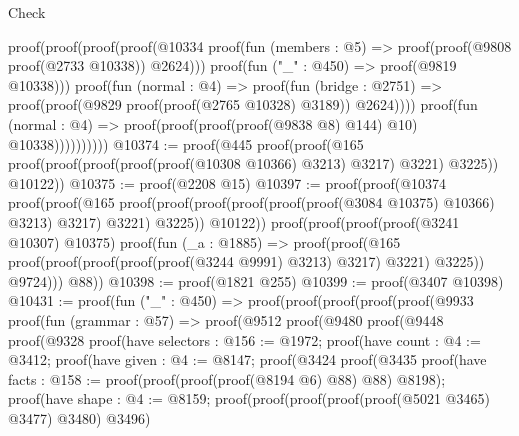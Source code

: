 \begin{lexlean}{Check}
\begin{coremodule}
                            proof(proof(proof(proof(@10334
                                      proof(fun (members : @5) =>
                                        proof(proof(@9808 proof(@2733 @10338)) @2624)))
                                    proof(fun ("_" : @450) => proof(@9819 @10338)))
                                  proof(fun (normal : @4) =>
                                    proof(fun (bridge : @2751) =>
                                      proof(proof(@9829 proof(proof(@2765 @10328) @3189)) @2624))))
                                proof(fun (normal : @4) =>
                                  proof(proof(proof(proof(@9838 @8) @144) @10) @10338))))))))))
@10374 := proof(@445
      proof(proof(@165 proof(proof(proof(proof(proof(@10308 @10366) @3213) @3217) @3221) @3225))
          @10122))
@10375 := proof(@2208 @15)
@10397 := proof(proof(@10374
        proof(proof(@165
              proof(proof(proof(proof(proof(proof(@3084 @10375) @10366) @3213) @3217) @3221) @3225))
            @10122))
      proof(proof(proof(proof(@3241 @10307) @10375)
            proof(fun (_a : @1885) =>
              proof(proof(@165
                    proof(proof(proof(proof(proof(@3244 @9991) @3213) @3217) @3221) @3225))
                  @9724)))
          @88))
@10398 := proof(@1821 @255)
@10399 := proof(@3407 @10398)
@10431 := proof(fun ("_" : @450) =>
    proof(proof(proof(proof(proof(@9933
                proof(fun (grammar : @57) =>
                  proof(@9512
                      proof(@9480
                          proof(@9448
                              proof(@9328
                                  proof(have selectors : @156 := @1972;
                                    proof(have count : @4 := @3412;
                                      proof(have given : @4 := @8147;
                                        proof(@3424
                                            proof(@3435
                                                proof(have facts : @158 := proof(proof(proof(proof(@8194
                                                            @6)
                                                          @88)
                                                        @88)
                                                      @8198);
                                                  proof(have shape : @4 := @8159;
                                                    proof(proof(proof(proof(proof(@5021 @3465)
                                                              @3477)
                                                            @3480)
                                                          @3496)

\end{coremodule}
\end{lexlean}
